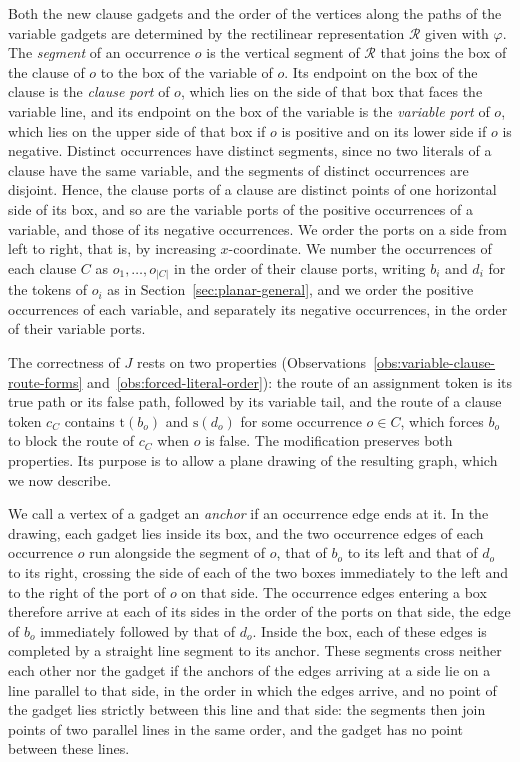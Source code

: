 \documentclass[a4paper,USenglish,thm-restate]{lipics-v2021}
\newcommand{\src}{\mathrm{s}}
\newcommand{\tgt}{\mathrm{t}}
\theoremstyle{problemstyle}
\begin{document}
Both the new clause gadgets and the order of the vertices along the paths of
the variable gadgets are determined by the rectilinear representation
$\mathcal{R}$ given with $\varphi$. The \emph{segment} of an occurrence $o$
is the vertical segment of $\mathcal{R}$ that joins the box of the clause of
$o$ to the box of the variable of $o$. Its endpoint on the box of the clause
is the \emph{clause port} of $o$, which lies on the side of that box that
faces the variable line, and its endpoint on the box of the variable is the
\emph{variable port} of $o$, which lies on the upper side of that box if $o$
is positive and on its lower side if $o$ is negative. Distinct occurrences
have distinct segments, since no two literals of a clause have the same
variable, and the segments of distinct occurrences are disjoint. Hence, the
clause ports of a clause are distinct points of one horizontal side of its
box, and so are the variable ports of the positive occurrences of a
variable, and those of its negative occurrences. We order the ports on a
side from left to right, that is, by increasing $x$-coordinate. We number
the occurrences of each clause $C$ as $o_1,\ldots,o_{|C|}$ in the order of
their clause ports, writing $b_i$ and $d_i$ for the tokens of $o_i$ as in
Section~\ref{sec:planar-general}, and we order the positive occurrences of
each variable, and separately its negative occurrences, in the order of
their variable ports.

The correctness of $J$ rests on two properties
(Observations~\ref{obs:variable-clause-route-forms}
and~\ref{obs:forced-literal-order}): the route of an assignment token is
its true path or its false path, followed by its variable tail, and the
route of a clause token $c_C$ contains $\tgt(b_o)$ and $\src(d_o)$ for some
occurrence $o\in C$, which forces $b_o$ to block the route of $c_C$ when $o$
is false. The modification preserves both properties. Its purpose is to
allow a plane drawing of the resulting graph, which we now describe.

We call a vertex of a gadget an \emph{anchor} if an occurrence edge ends at
it. In the drawing, each gadget lies inside its box, and the two occurrence
edges of each occurrence $o$ run alongside the segment of $o$, that of $b_o$
to its left and that of $d_o$ to its right, crossing the side of each of the
two boxes immediately to the left and to the right of the port of $o$ on
that side. The occurrence edges entering a box therefore arrive at each of
its sides in the order of the ports on that side, the edge of $b_o$
immediately followed by that of $d_o$. Inside the box, each of these edges
is completed by a straight line segment to its anchor. These segments cross
neither each other nor the gadget if the anchors of the edges arriving at a
side lie on a line parallel to that side, in the order in which the edges
arrive, and no point of the gadget lies strictly between this line and that
side: the segments then join points of two parallel lines in the same
order, and the gadget has no point between these lines.
\end{document}
